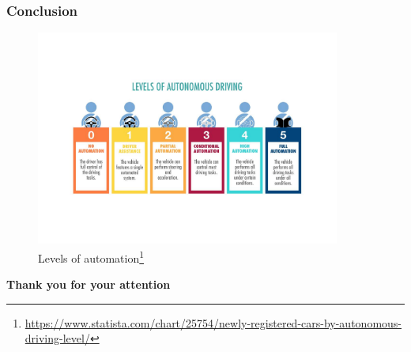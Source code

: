 \documentclass[xcolor=dvipsnames]{beamer}
\begin{document}
\begin{frame}[fragile=singleslide]\frametitle{\bf{Conclusion}}
    \centering
    \begin{figure}
        \centering
        \caption{Levels of automation\footnote{\tiny{\url{https://www.statista.com/chart/25754/newly-registered-cars-by-autonomous-driving-level/}}}}
        \vspace*{-1.1cm}
        \includegraphics[width=10cm]{levels.pdf}
    \end{figure}
\end{frame}



\begin{frame}[fragile=singleslide]
\centering
\hspace*{1cm}
\vspace*{-1cm}
\LARGE{\textbf{Thank you for your attention}}
\end{frame}
\end{document}
